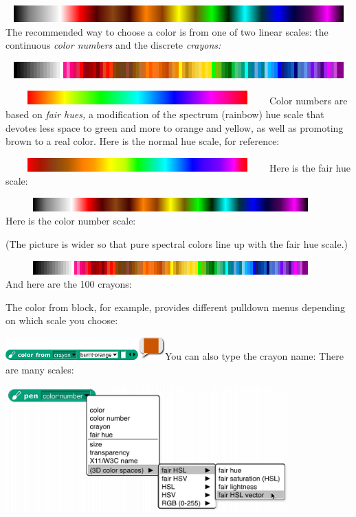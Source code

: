 \includegraphics[width=7.5in,height=0.25in]{media/image416.png}The
recommended way to choose a color is from one of two linear scales: the
continuous \emph{color numbers} and the discrete \emph{crayons:}

\includegraphics[width=7.5in,height=0.25in]{media/image417.png}

\includegraphics[width=4in,height=0.20833in]{media/image418.png}Color
numbers are based on \emph{fair hues,} a modification of the spectrum
(rainbow) hue scale that devotes less space to green and more to orange
and yellow, as well as promoting brown to a real color. Here is the
normal hue scale, for reference:

\includegraphics[width=4in,height=0.20833in]{media/image419.png}Here is
the fair hue scale:

\includegraphics[width=5in,height=0.20833in]{media/image416.png}Here is
the color number scale:

(The picture is wider so that pure spectral colors line up with the fair
hue scale.)

\includegraphics[width=5in,height=0.20833in]{media/image417.png}And here
are the 100 crayons:

The color from block, for example, provides different pulldown menus
depending on which scale you choose:

\includegraphics[width=2.41667in,height=0.34444in]{media/image420.png}You
can also type the crayon name: There are many scales:

\includegraphics[width=4.29167in,height=1.90972in]{media/image427.png}

